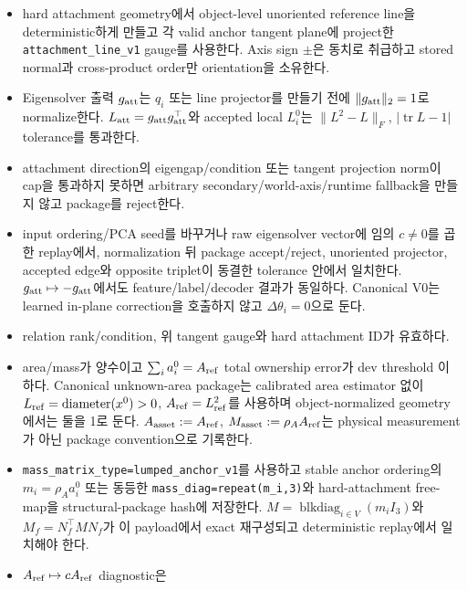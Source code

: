 \documentclass[10pt]{article}
\newcommand{\code}[1]{{\small\nolinkurl{#1}}}
\begin{document}
\begin{itemize}
  \item [\(\square\)] hard attachment geometry에서 object-level unoriented reference line을
  deterministic하게 만들고 각 valid anchor tangent plane에 project한
  \code{attachment\_line\_v1} gauge를 사용한다. Axis sign \(\pm\)은 동치로 취급하고
  stored normal과 cross-product order만 orientation을 소유한다.
  \item [\(\square\)] Eigensolver 출력 \(g_{\rm att}\)는 \(q_i\) 또는 line projector를 만들기 전에
  \(\|g_{\rm att}\|_2=1\)로 normalize한다.
  \(L_{\rm att}=g_{\rm att}g_{\rm att}^{\top}\)와 accepted local \(L_i^0\)는
  \(\|L^2-L\|_F\), \(|\operatorname{tr}L-1|\) tolerance를 통과한다.
  \item [\(\square\)] attachment direction의 eigengap/condition 또는 tangent projection norm이
  cap을 통과하지 못하면 arbitrary secondary/world-axis/runtime fallback을 만들지 않고
  package를 reject한다.
  \item [\(\square\)] input ordering/PCA seed를 바꾸거나 raw eigensolver vector에
  임의 \(c\neq0\)를 곱한 replay에서, normalization 뒤 package accept/reject,
  unoriented projector, accepted edge와 opposite triplet이 동결한 tolerance 안에서 일치한다.
  \(g_{\rm att}\mapsto-g_{\rm att}\)에서도 feature/label/decoder 결과가 동일하다.
  Canonical V0는 learned in-plane correction을 호출하지 않고 \(\Delta\theta_i=0\)으로 둔다.
  \item [\(\square\)] relation rank/condition, 위 tangent gauge와 hard attachment ID가 유효하다.
  \item [\(\square\)] area/mass가 양수이고
  \(\sum_i a_i^0=A_{\rm ref}\) total ownership error가 dev threshold 이하다.
  Canonical unknown-area package는 calibrated area estimator 없이
  \(L_{\rm ref}=\operatorname{diameter}(x^0)>0\),
  \(A_{\rm ref}=L_{\rm ref}^2\)를 사용하며 object-normalized geometry에서는 둘을 1로 둔다.
  \(A_{\rm asset}:=A_{\rm ref}\), \(M_{\rm asset}:=\rho_AA_{\rm ref}\)는
  physical measurement가 아닌 package convention으로 기록한다.
  \item [\(\square\)] \code{mass\_matrix\_type=lumped\_anchor\_v1}를 사용하고 stable anchor ordering의
  \(m_i=\rho_Aa_i^0\) 또는 동등한 \code{mass\_diag=repeat(m\_i,3)}와
  hard-attachment free-map을 structural-package hash에 저장한다.
  \(M=\operatorname{blkdiag}_{i\in V}(m_iI_3)\)와
  \(M_f=N_f^\top MN_f\)가 이 payload에서 exact 재구성되고 deterministic replay에서 일치해야 한다.
  \item [\(\square\)] \(A_{\rm ref}\mapsto cA_{\rm ref}\) diagnostic은

\end{itemize}
\end{document}
